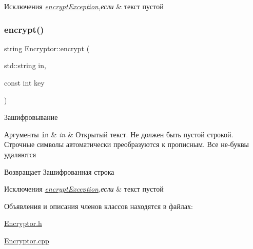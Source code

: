 \begin{DoxyExceptions}{Исключения}
{\em \hyperlink{classencryptException}{encrypt\+Exception},если} & текст пустой \\
\hline
\end{DoxyExceptions}
\mbox{\label{classEncryptor_abbf2ea9dfa0bcf5204375fc2a821f19d}} 
\subsubsection{\texorpdfstring{encrypt()}{encrypt()}}
{\footnotesize\ttfamily string Encryptor\+::encrypt (\begin{DoxyParamCaption}\item[{std\+::string}]{in,  }\item[{const int}]{key }\end{DoxyParamCaption})}



Зашифровывание 


\begin{DoxyParams}[1]{Аргументы}
\mbox{\tt in}  & {\em in} & Открытый текст. Не должен быть пустой строкой. Строчные символы автоматически преобразуются к прописным. Все не-\/буквы удаляются \\
\hline
\end{DoxyParams}
\begin{DoxyReturn}{Возвращает}
Зашифрованная строка 
\end{DoxyReturn}

\begin{DoxyExceptions}{Исключения}
{\em \hyperlink{classencryptException}{encrypt\+Exception},если} & текст пустой \\
\hline
\end{DoxyExceptions}


Объявления и описания членов классов находятся в файлах\+:\begin{DoxyCompactItemize}
\item 
\hyperlink{Encryptor_8h}{Encryptor.\+h}\item 
\hyperlink{Encryptor_8cpp}{Encryptor.\+cpp}\end{DoxyCompactItemize}

